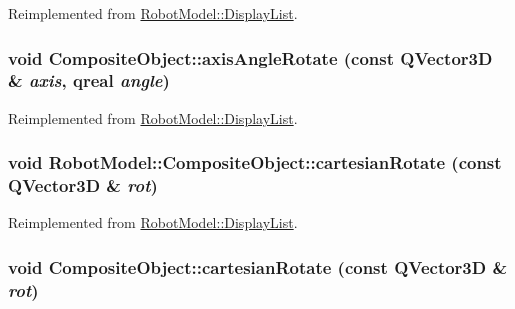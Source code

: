 Reimplemented from \hyperlink{class_robot_model_1_1_display_list_a9a7084168997ac285ee1e9f4041a8d57}{RobotModel::DisplayList}.\hypertarget{class_robot_model_1_1_composite_object_a357f5ed3f49e0889df511271e468f866}{
\subsubsection[{axisAngleRotate}]{\setlength{\rightskip}{0pt plus 5cm}void CompositeObject::axisAngleRotate (const QVector3D \& {\em axis}, \/  qreal {\em angle})}}
\label{class_robot_model_1_1_composite_object_a357f5ed3f49e0889df511271e468f866}


Reimplemented from \hyperlink{class_robot_model_1_1_display_list_a9a7084168997ac285ee1e9f4041a8d57}{RobotModel::DisplayList}.\hypertarget{class_robot_model_1_1_composite_object_a7c46e273df7d93cb51b9e16158469509}{
\subsubsection[{cartesianRotate}]{\setlength{\rightskip}{0pt plus 5cm}void RobotModel::CompositeObject::cartesianRotate (const QVector3D \& {\em rot})}}
\label{class_robot_model_1_1_composite_object_a7c46e273df7d93cb51b9e16158469509}


Reimplemented from \hyperlink{class_robot_model_1_1_display_list_a023ba88eaac38b26dc9ea6a358467637}{RobotModel::DisplayList}.\hypertarget{class_robot_model_1_1_composite_object_adadc29cccbba9cb615eaf0ad2fbdd337}{
\subsubsection[{cartesianRotate}]{\setlength{\rightskip}{0pt plus 5cm}void CompositeObject::cartesianRotate (const QVector3D \& {\em rot})}}
\label{class_robot_model_1_1_composite_object_adadc29cccbba9cb615eaf0ad2fbdd337}



